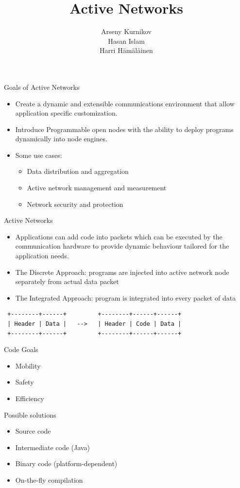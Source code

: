 \documentclass{beamer}
\title{Active Networks}
\author{Arseny Kurnikov\\
Hasan Islam\\
Harri Hämäläinen}
\begin{document}
\begin{frame}
\titlepage
\end{frame}

\begin{frame}[fragile]{Goals of Active Networks}
	\begin{itemize}
		\item Create a dynamic and extensible communications environment that allow application specific customization.
		\item Introduce Programmable open nodes with the ability to deploy programs dynamically into node engines.
        \item Some use cases:
        \begin{itemize}
            \item Data distribution and aggregation
            \item Active network management and measurement
            \item Network security and protection
        \end{itemize}
	\end{itemize}
	
\end{frame}

\begin{frame}[fragile]{Active Networks}
    \begin{itemize}
        \item Applications can add code into packets which can be executed by
        the communication hardware to provide dynamic behaviour tailored for the
        application needs.
		\item The Discrete Approach: programs are injected into active network node separately from actual data packet
		\item The Integrated Approach: program is integrated into every packet of data
    \end{itemize}
    \begin{verbatim}
 +--------+------+         +--------+------+------+
 | Header | Data |   -->   | Header | Code | Data |
 +--------+------+         +--------+------+------+
    \end{verbatim}
\end{frame}

\begin{frame}{Code}
  Goals
	\begin{itemize}
		\item Mobility
    \item Safety
    \item Efficiency
	\end{itemize}
  Possible solutions
  \begin{itemize}
    \item Source code
    \item Intermediate code (Java)
    \item Binary code (platform-dependent)
    \item On-the-fly compilation
  \end{itemize}
	
\end{frame}
\end{document}
